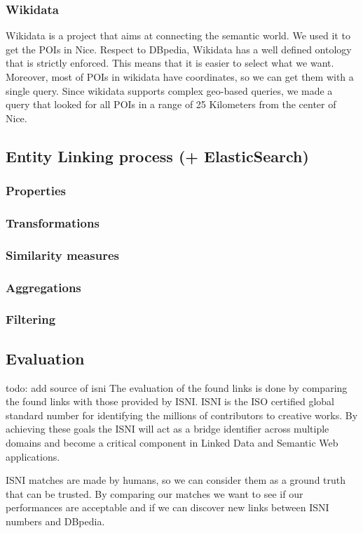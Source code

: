 \subsubsection{Wikidata}
Wikidata is a project that aims at connecting the semantic world. We used it to get the POIs in Nice. Respect to DBpedia, Wikidata has a well defined ontology that is strictly enforced. This means that it is easier to select what we want. Moreover, most of POIs in wikidata have coordinates, so we can get them with a single query. Since wikidata supports complex geo-based queries, we made a query that looked for all POIs in a range of 25 Kilometers from the center of Nice.




\subsection{Entity Linking process (+ ElasticSearch)}
\subsubsection{Properties}
\subsubsection{Transformations}
\subsubsection{Similarity measures}
\subsubsection{Aggregations}
\subsubsection{Filtering}
\subsection{Evaluation}
todo: add source of isni
The evaluation of the found links is done by comparing the found links with those provided by ISNI. ISNI is the ISO certified global standard number for identifying the millions of contributors to creative works. By achieving these goals the ISNI will act as a bridge identifier across multiple domains and become a critical component in Linked Data and Semantic Web applications.

ISNI matches are made by humans, so we can consider them as a ground truth that can be trusted. By comparing our matches we want to see if our performances are acceptable and if we can discover new links between ISNI numbers and DBpedia.

